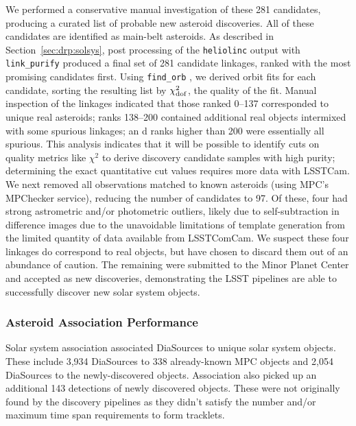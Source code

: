 We performed a conservative manual investigation of these 281 candidates, producing a curated list of \nnewasteroiddiscoveries probable new asteroid discoveries.
All of these candidates are identified as main-belt asteroids.
As described in Section~\ref{sec:drp:solsys}, post processing of the {\tt heliolinc} output with {\tt link\_purify} produced a final set of 281 candidate linkages, ranked with the most promising candidates first.
Using {\tt find\_orb} \citep{findorb}, we derived orbit fits for each candidate, sorting the resulting list by $\chi_{\rm dof}^2$, the quality of the fit.
Manual inspection of the linkages indicated that those ranked 0--137 corresponded to unique real asteroids; ranks 138--200 contained additional real objects intermixed with some spurious linkages; an d ranks higher than 200 were essentially all spurious.
This analysis indicates that it will be possible to identify cuts on quality metrics like $\chi^2$ to derive discovery candidate samples with high purity; determining the exact quantitative cut values requires more data with \gls{LSSTCam}.
We next removed all observations matched to known asteroids (using \gls{MPC}'s MPChecker service), reducing the number of candidates to 97.
Of these, four had strong astrometric and/or photometric outliers, likely due to self-subtraction in difference images due to the unavoidable limitations of template generation from the limited quantity of data available from  \gls{LSSTComCam}.
We suspect these four linkages do correspond to real objects, but have chosen to discard them out of an abundance of caution.
The remaining \nnewasteroiddiscoveries were submitted to the Minor Planet Center and accepted as new discoveries, demonstrating the \gls{LSST} pipelines are able to successfully discover new solar system objects.

\subsubsection{Asteroid Association Performance}

Solar system association associated \nsolarsystemsources DiaSources to \nsolarsystemobjects unique solar system objects. 
These include 3,934 DiaSources to 338 already-known \gls{MPC} objects and 2,054 DiaSources to the \nnewasteroiddiscoveries  newly-discovered objects.
Association also picked up an additional 143 detections of newly discovered objects.
These were not originally found by the discovery pipelines as they didn't satisfy the number and/or maximum time span requirements to form tracklets.

